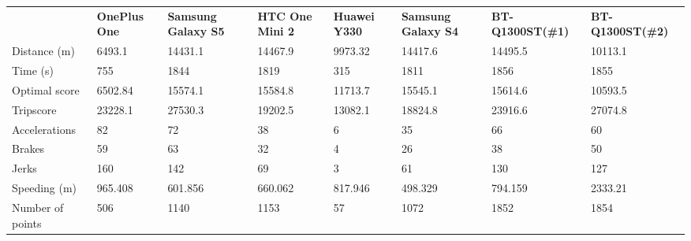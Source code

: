 \begin{landscape}
\begin{table*}[h]
\begin{minipage}{0.95\textwidth}
\begin{tabular}{|l|lllllll|}
                 & \textbf{OnePlus One} & \textbf{Samsung Galaxy S5} & \textbf{HTC One Mini 2} & \textbf{Huawei Y330} & \textbf{Samsung Galaxy S4} & \textbf{BT-Q1300ST(\#1)} & \textbf{BT-Q1300ST(\#2)} \\
Distance (m)     & 6493.1      & 14431.1           & 14467.9        & 9973.32     & 14417.6           & 14495.5         & 10113.1         \\
Time (s)         & 755         & 1844              & 1819           & 315         & 1811              & 1856            & 1855            \\
Optimal score    & 6502.84     & 15574.1           & 15584.8        & 11713.7     & 15545.1           & 15614.6         & 10593.5         \\
Tripscore        & 23228.1     & 27530.3           & 19202.5        & 13082.1     & 18824.8           & 23916.6         & 27074.8         \\
Accelerations    & 82          & 72                & 38             & 6           & 35                & 66              & 60              \\
Brakes           & 59          & 63                & 32             & 4           & 26                & 38              & 50              \\
Jerks            & 160         & 142               & 69             & 3           & 61                & 130             & 127             \\
Speeding (m)     & 965.408     & 601.856           & 660.062        & 817.946     & 498.329           & 794.159         & 2333.21         \\
Number of points & 506         & 1140              & 1153           & 57          & 1072              & 1852            & 1854      \\\hline     

\end{tabular}
\end{minipage}
\end{table*}
\end{landscape}
